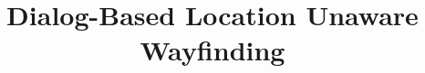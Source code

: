 \documentclass{iitkthesis}
\begin{document}

\title{Dialog-Based Location Unaware Wayfinding}
%
%
%
%
%
\end{document}
